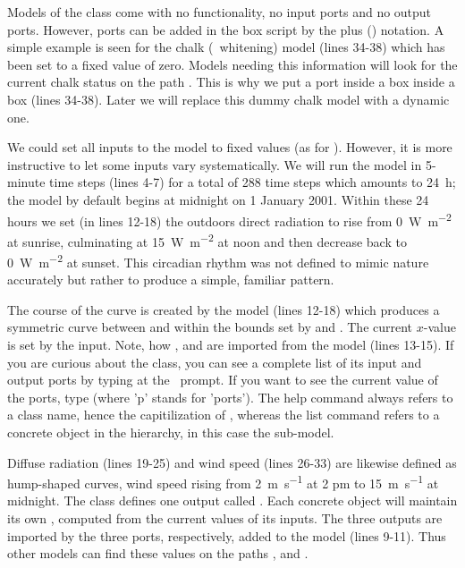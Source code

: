 Models of the  class come with no functionality, no input ports and no output ports. However, ports can be added in the box script by the plus (\code{+}) notation. A simple example is seen for the chalk (\ie\ whitening) model (lines 34-38) which has been set to a fixed value of zero. Models needing this information will look for the current chalk status on the path . This is why we put a  port inside a  box inside a  box (lines 34-38). Later we will replace this dummy chalk model with a dynamic one.

We could set all inputs to the model to fixed values (as for ). However, it is more instructive to let some inputs vary systematically. We will run the model in 5-minute time steps (lines 4-7) for a total of 288 time steps which amounts to \SI{24}{\hour}; the  model by default begins at midnight on 1 January 2001. Within these 24 hours we set (in lines 12-18) the outdoors direct radiation to rise from \SI{0}{\watt\per\metre\squared} at sunrise, culminating at \SI{15}{\watt\per\metre\squared} at noon and then decrease back to \SI{0}{\watt\per\metre\squared} at sunset. This circadian rhythm was not defined to mimic nature accurately but rather to produce a simple, familiar pattern. 

The course of the curve is created by the  model (lines 12-18) which produces a symmetric curve between  and  within the bounds set by  and . The current $x$-value is set by the  input. Note, how ,  and  are imported from the  model (lines 13-15). If you are curious about the  class, you can see a complete list of its input and output ports by typing  at the \US\ prompt. If you want to see the current value of the ports, type  (where 'p' stands for 'ports'). The help command always refers to a class name, hence the capitilization of , whereas the list command refers to a concrete object in the hierarchy, in this case the  sub-model.

Diffuse radiation (lines 19-25) and wind speed (lines 26-33) are likewise defined as hump-shaped curves, wind speed rising from \SI{2}{\metre\per\second} at 2 pm to  \SI{15}{\metre\per\second} at midnight. The  class defines one output called . Each concrete  object will maintain its own , computed from the current values of its inputs. The three  outputs are imported by the three ports, respectively, added to the  model (lines 9-11). Thus other models can find these values on the paths ,  and .


